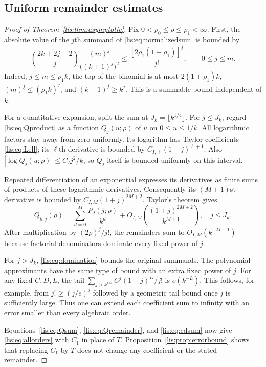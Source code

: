 \documentclass[11pt,letterpaper]{article}
\numberwithin{equation}{section}
\theoremstyle{definition}
\newcommand{\fall}[2]{(#1)^{\underline{#2}}}
\newcommand{\rise}[2]{(#1)^{\overline{#2}}}
\begin{document}
\subsection{Uniform remainder estimates}
\begin{proof}[Proof of Theorem~\ref{lis:thm:asymptotic}]
Fix $0<\rho_0\le\rho\le\rho_1<\infty$.
First, the absolute value of the $j$th summand of
\eqref{lis:eq:normalizedsum} is bounded by
\begin{equation}
 \binom{2k+2j-2}{j}\frac{\fall{m}{j}}{\bigl(\rise{k+1}{j}\bigr)^2}
 \le\frac{[2\rho_1(1+\rho_1)]^j}{j!},\qquad 0\le j\le m.
 \label{lis:eq:domination}
\end{equation}
Indeed, $j\le m\le\rho_1k$, the top of the binomial is at most
$2(1+\rho_1)k$, $\fall{m}{j}\le(\rho_1k)^j$, and
$\rise{k+1}{j}\ge k^j$. This is a summable bound independent of $k$.

For a quantitative expansion, split the sum at $J_k=\lfloor k^{1/4}\rfloor$.
For $j\le J_k$, regard \eqref{lis:eq:Qproduct} as a function $Q_j(u;\rho)$
of $u$ on $0\le u\le1/k$. All logarithmic factors stay away from zero
uniformly. Its logarithm has Taylor coefficients \eqref{lis:eq:Lell};
its $\ell$th derivative is bounded by $C_{I,\ell}(1+j)^{\ell+1}$.
Also $|\log Q_j(u;\rho)|\le C_Ij^2/k$, so $Q_j$ itself is bounded
uniformly on this interval.

Repeated differentiation of an exponential expresses its derivatives
as finite sums of products of these logarithmic derivatives.
Consequently its $(M+1)$st derivative is bounded by
$C_{I,M}(1+j)^{2M+2}$. Taylor's theorem gives
\begin{equation}
 Q_{k,j}(\rho)=\sum_{d=0}^{M}\frac{P_d(j;\rho)}{k^d}
    +O_{I,M}\left(\frac{(1+j)^{2M+2}}{k^{M+1}}\right),
 \quad j\le J_k.\label{lis:eq:Qremainder}
\end{equation}
After multiplication by $(2\rho)^j/j!$, the remainders sum to
$O_{I,M}(k^{-M-1})$ because factorial denominators dominate every
fixed power of $j$.

For $j>J_k$, \eqref{lis:eq:domination} bounds the original summands.
The polynomial approximants have the same type of bound with an extra
fixed power of $j$. For any fixed $C,D,L$, the tail
$\sum_{j>k^{1/4}}C^j(1+j)^D/j!$ is $o(k^{-L})$.
This follows, for example, from $j!\ge(j/e)^j$ followed by a geometric
tail bound once $j$ is sufficiently large. Thus one can extend each
coefficient sum to infinity with an error smaller than every algebraic
order.

Equations~\eqref{lis:eq:Qsum}, \eqref{lis:eq:Qremainder}, and
\eqref{lis:eq:cdsum} now give \eqref{lis:eq:allorders} with $C_1$ in place of
$T$. Proposition~\ref{lis:prop:errorbound} shows that replacing $C_1$ by
$T$ does not change any coefficient or the stated remainder.
\end{proof}
\end{document}
